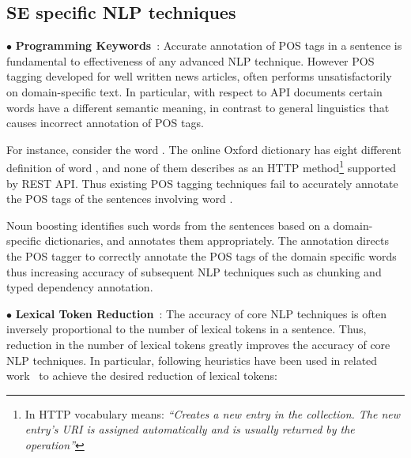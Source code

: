 

\subsection{SE specific NLP techniques}
\label{sub:SENLPback}

{\small $\bullet$} \textbf{Programming Keywords}~\cite{pandita12:inferring}: Accurate annotation of POS tags in a sentence is fundamental to effectiveness of any advanced NLP technique.
However POS tagging developed for well written news articles, often performs unsatisfactorily on domain-specific text.
In particular, with respect to API documents certain words have a different semantic meaning, in contrast to general linguistics that causes incorrect annotation of POS tags.

For instance, consider the word . 
The online Oxford dictionary %
has eight different definition of word , and none of them describes  as an HTTP method\footnote{In HTTP vocabulary  means: \textit{``Creates a new entry in the collection.
The new entry's URI is assigned automatically and is usually returned by the operation''}}
supported by REST API.
Thus existing POS tagging techniques fail to accurately annotate the POS tags of the sentences involving word .  

Noun boosting identifies such words from the sentences based on a domain-specific dictionaries, and annotates them appropriately.
The annotation directs the POS tagger to correctly annotate the POS tags of the domain specific words thus increasing accuracy of subsequent NLP techniques such as chunking and typed dependency annotation.

{\small $\bullet$} \textbf{Lexical Token Reduction}~\cite{pandita13:WHYPER}:
The accuracy of core NLP techniques is often inversely proportional to the number of lexical tokens in a sentence.
Thus, reduction in the number of lexical tokens greatly improves the accuracy of core NLP techniques. 
In particular, following heuristics have been used in related work~\cite{pandita12:inferring,pandita13:WHYPER} to achieve the desired reduction of lexical tokens:

